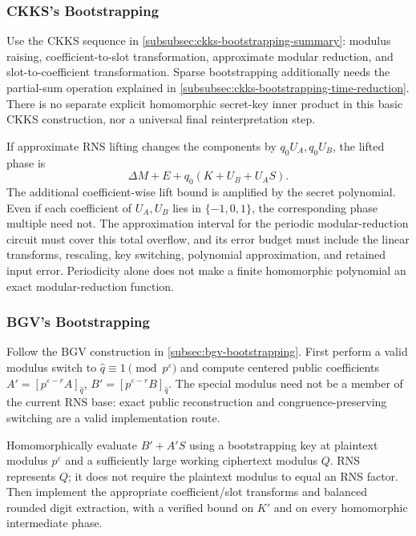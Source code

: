\subsubsection{CKKS's Bootstrapping}
\label{subsubsec:rns-ckks-bootstrapping}

Use the CKKS sequence in \autoref{subsubsec:ckks-bootstrapping-summary}: modulus raising, coefficient-to-slot transformation, approximate modular reduction, and slot-to-coefficient transformation. Sparse bootstrapping additionally needs the partial-sum operation explained in \autoref{subsubsec:ckks-bootstrapping-time-reduction}. There is no separate explicit homomorphic secret-key inner product in this basic CKKS construction, nor a universal final reinterpretation step.

If approximate RNS lifting changes the components by $q_0U_A,q_0U_B$, the lifted phase is
\[
\Delta M+E+q_0(K+U_B+U_AS).
\]
The additional coefficient-wise lift bound is amplified by the secret polynomial. Even if each coefficient of $U_A,U_B$ lies in $\{-1,0,1\}$, the corresponding phase multiple need not. The approximation interval for the periodic modular-reduction circuit must cover this total overflow, and its error budget must include the linear transforms, rescaling, key switching, polynomial approximation, and retained input error. Periodicity alone does not make a finite homomorphic polynomial an exact modular-reduction function.


\subsubsection{BGV's Bootstrapping}
\label{subsubsec:rns-bgv-bootstrapping}

Follow the BGV construction in \autoref{subsec:bgv-bootstrapping}. First perform a valid modulus switch to $\hat q\equiv1\pmod{p^\varepsilon}$ and compute centered public coefficients $A'=[p^{\varepsilon-r}A]_{\hat q}$, $B'=[p^{\varepsilon-r}B]_{\hat q}$. The special modulus need not be a member of the current RNS base: exact public reconstruction and congruence-preserving switching are a valid implementation route.

Homomorphically evaluate $B'+A'S$ using a bootstrapping key at plaintext modulus $p^\varepsilon$ and a sufficiently large working ciphertext modulus $Q$. RNS represents $Q$; it does not require the plaintext modulus to equal an RNS factor. Then implement the appropriate coefficient/slot transforms and balanced rounded digit extraction, with a verified bound on $K'$ and on every homomorphic intermediate phase.

